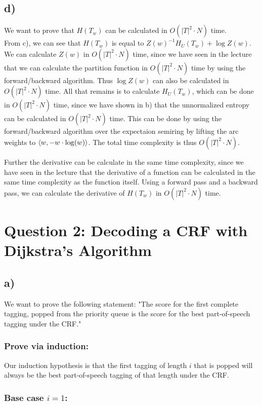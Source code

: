 \documentclass[a4paper,12pt]{ETHexercise}
\begin{document}
\subsection*{d)}
We want to prove that $H(T_w)$ can be calculated in $O(|T|^2 \cdot N)$ time.\\

From c), we can see that $H(T_w)$  is equal to $Z(w)^{-1}H_{U}(T_w)+\log Z(w)$.
We can calculate $Z(w)$ in $O(|T|^2 \cdot N)$ time, since we have seen in the lecture that we can calculate the partition function in $O(|T|^2 \cdot N)$ time by using the forward/backward algorithm. Thus $\log Z(w)$ can also be calculated in $O(|T|^2 \cdot N)$ time.
All that remains is to calculate $H_{U}(T_w)$, which can be done in $O(|T|^2 \cdot N)$ time, since we have shown in b) that the unnormalized entropy can be calculated in $O(|T|^2 \cdot N)$ time. This can be done by using the forward/backward algorithm over the expectaion semiring by lifting the arc weights to $\left\langle w, -w \cdot \log (w)\right\rangle$.
The total time complexity is thus $O(|T|^2 \cdot N)$.

Further the derivative can be calculate in the same time complexity, since we have seen in the lecture that the derivative of a function can be calculated in the same time complexity as the function itself. Using a forward pass and a backward pass, we can calculate the derivative of $H(T_w)$ in $O(|T|^2 \cdot N)$ time.

\section*{Question 2: Decoding a CRF with Dijkstra's Algorithm}
\subsection*{a)}
We want to prove the following statement: "The score for the first complete tagging, popped from the priority queue is the score for the best part-of-speech tagging under the CRF."

\subsubsection*{Prove via induction:}

Our induction hypothesis is that the first tagging of length $i$ that is popped will always be the best part-of-speech tagging of that length under the CRF.

\subsubsection*{Base case $i=1$:}
\end{document}
